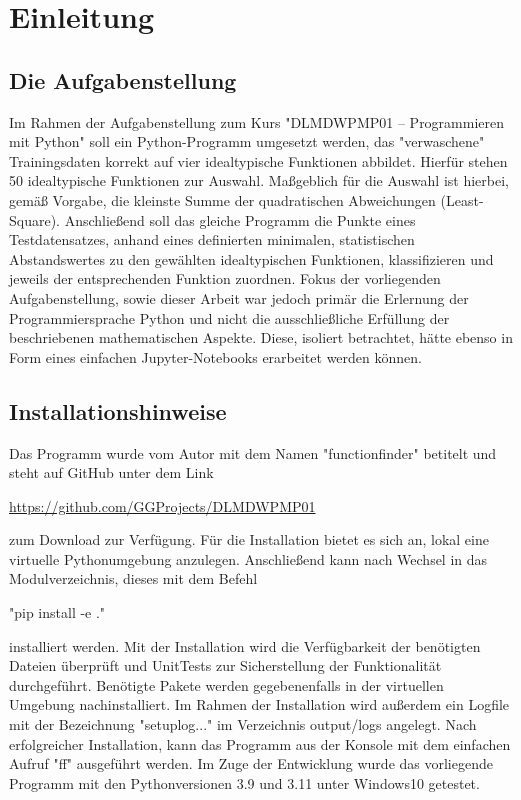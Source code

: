 \chapter{Einleitung}

\section{Die Aufgabenstellung}

Im Rahmen der Aufgabenstellung zum Kurs "DLMDWPMP01 – Programmieren mit Python" soll ein Python-Programm umgesetzt werden, das "verwaschene" Trainingsdaten korrekt auf vier idealtypische Funktionen abbildet. Hierfür stehen 50 idealtypische Funktionen zur Auswahl. Maßgeblich für die Auswahl ist hierbei, gemäß Vorgabe, die kleinste Summe der quadratischen Abweichungen (Least-Square).
Anschließend soll das gleiche Programm die Punkte eines Testdatensatzes, anhand eines definierten minimalen, statistischen Abstandswertes zu den gewählten idealtypischen Funktionen, klassifizieren und jeweils der entsprechenden Funktion zuordnen.
Fokus der vorliegenden Aufgabenstellung, sowie dieser Arbeit war jedoch primär die Erlernung der Programmiersprache Python und nicht die ausschließliche Erfüllung der beschriebenen mathematischen Aspekte. Diese, isoliert betrachtet, hätte ebenso in Form eines einfachen Jupyter-Notebooks erarbeitet werden können.

\section{Installationshinweise}

Das Programm wurde vom Autor mit dem Namen "functionfinder" betitelt und steht auf GitHub unter dem Link \begin{center}\url{https://github.com/GGProjects/DLMDWPMP01}\end{center} zum Download zur Verfügung.
Für die Installation bietet es sich an, lokal eine virtuelle Pythonumgebung anzulegen. Anschließend kann nach Wechsel in das Modulverzeichnis, dieses mit dem Befehl
\begin{center}"pip install -e ."\end{center}
installiert werden.
Mit der Installation wird die Verfügbarkeit der benötigten Dateien überprüft und UnitTests zur Sicherstellung der Funktionalität durchgeführt. Benötigte Pakete werden gegebenenfalls in der virtuellen Umgebung nachinstalliert. Im Rahmen der Installation wird außerdem ein Logfile mit der Bezeichnung "setuplog..." im Verzeichnis output/logs angelegt.
Nach erfolgreicher Installation, kann das Programm aus der Konsole mit dem einfachen Aufruf "ff" ausgeführt werden.
Im Zuge der Entwicklung wurde das vorliegende Programm mit den Pythonversionen 3.9 und 3.11 unter Windows10 getestet.

